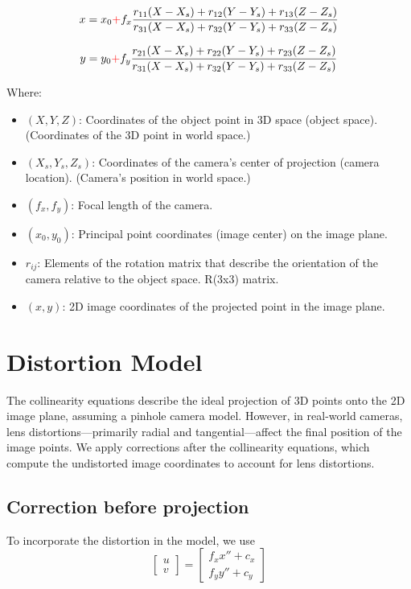 \[
x = x_0 \textcolor{red}{+} f_x\frac{r_{11}(X - X_s) + r_{12}(Y - Y_s) + r_{13}(Z - Z_s)}{r_{31}(X - X_s) + r_{32}(Y - Y_s) + r_{33}(Z - Z_s)}
\]

\[
y = y_0 \textcolor{red}{+} f_y\frac{r_{21}(X - X_s) + r_{22}(Y - Y_s) + r_{23}(Z - Z_s)}{r_{31}(X - X_s) + r_{32}(Y - Y_s) + r_{33}(Z - Z_s)}
\]


Where:
\begin{itemize}
    \item $(X, Y, Z)$: Coordinates of the object point in 3D space (object space). (Coordinates of the 3D point in world space.)
    \item $(X_s, Y_s, Z_s)$: Coordinates of the camera's center of projection (camera location). (Camera's position in world space.)
    \item $(f_x, f_y)$: Focal length of the camera.
    \item $(x_0, y_0)$: Principal point coordinates (image center) on the image plane.
    \item $r_{ij}$: Elements of the rotation matrix that describe the orientation of the camera relative to the object space. R(3x3) matrix.
    \item $(x, y)$: 2D image coordinates of the projected point in the image plane.
\end{itemize}






\section{Distortion Model}

The collinearity equations describe the ideal projection of 3D points onto the 2D image plane, assuming a pinhole camera model. However, in real-world cameras, lens distortions—primarily radial and tangential—affect the final position of the image points. We apply corrections after the collinearity equations, which compute the undistorted image coordinates to account for lens distortions.

\subsection{Correction before projection}
To incorporate the distortion in the model, we use
\[
\begin{bmatrix}
    u \\ v
\end{bmatrix} =
\begin{bmatrix}
    f_x x'' + c_x \\
    f_y y'' + c_y
\end{bmatrix}
\]

